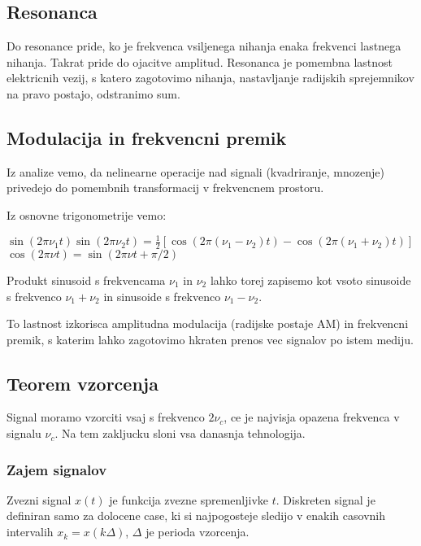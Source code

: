 \documentclass{article}
\begin{document}
\begin{multicols}{4}
\subsection{Resonanca}
Do resonance pride, ko je frekvenca vsiljenega nihanja enaka frekvenci lastnega nihanja. Takrat pride do ojacitve amplitud.
Resonanca je pomembna lastnost elektricnih vezij, s katero zagotovimo nihanja, nastavljanje radijskih sprejemnikov na pravo postajo,
odstranimo sum.

\subsection{Modulacija in frekvencni premik}
Iz analize vemo, da nelinearne operacije nad signali (kvadriranje, mnozenje) privedejo do 
pomembnih transformacij v frekvencnem prostoru.

Iz osnovne trigonometrije vemo:
\begin{center}
    \begin{math}
        \sin(2 \pi \nu_1 t) \sin(2 \pi \nu_2 t) = \frac{1}{2} [\cos(2 \pi(\nu_1 - \nu_2)t) - \cos(2 \pi (\nu_1 + \nu_2)t)]
    \end{math}\\
    \begin{math}
        \cos(2 \pi \nu t) = \sin(2 \pi \nu t + \pi / 2)
    \end{math}
\end{center}
Produkt sinusoid s frekvencama $\nu_1$ in $\nu_2$ lahko torej zapisemo kot vsoto sinusoide s frekvenco $\nu_1 + \nu_2$ in 
sinusoide s frekvenco $\nu_1 - \nu_2$.

To lastnost izkorisca amplitudna modulacija (radijske postaje AM) in frekvencni premik, s katerim lahko zagotovimo
hkraten prenos vec signalov po istem mediju.

\subsection{Teorem vzorcenja}
Signal moramo vzorciti vsaj s frekvenco $2 \nu_c$, ce je najvisja opazena frekvenca v signalu $\nu_c$. Na tem zakljucku
sloni vsa danasnja tehnologija.

\subsubsection{Zajem signalov}
Zvezni signal $x(t)$ je funkcija zvezne spremenljivke $t$. Diskreten signal je definiran samo za dolocene case, ki
si najpogosteje sledijo v enakih casovnih intervalih $x_k = x(k \Delta)$, $\Delta$ je perioda vzorcenja.


\end{multicols}
\end{document}
